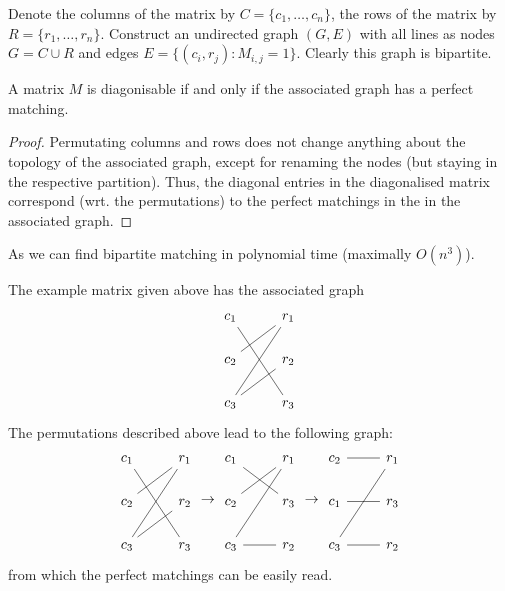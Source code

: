 \documentclass{article}
\begin{document}
\begin{solving}
    Denote the columns of the matrix by $C = \{c_1,\dots, c_n\}$, the rows of the matrix by $R = \{r_1,\dots ,r_n\}$. Construct an undirected graph $(G, E)$ with all lines as nodes $G = C\cup R$ and edges $E = \{ (c_i, r_j) : M_{i,j} = 1\}$. Clearly this graph is bipartite. 
    \begin{proposition}
        A matrix $M$ is diagonisable if and only if the associated graph has a perfect matching.
    \end{proposition}
    \begin{proof}
        Permutating columns and rows does not change anything about the topology of the associated graph, except for renaming the nodes (but staying in the respective partition). Thus, the diagonal entries in the diagonalised matrix correspond (wrt. the permutations) to the perfect matchings in the in the associated graph.
    \end{proof}
    As we can find bipartite matching in polynomial time (maximally $O(n^3)$). 


    \begin{example}
        The example matrix given above has the associated graph
        \begin{equation*}
            \begin{tikzcd}
            c_1\arrow[rdd, no head]&r_1\\
            c_2\arrow[ru, no head]&r_2\\
            c_3\arrow[ruu,  no head]\arrow[ru, no head]&r_3
            \end{tikzcd}
        \end{equation*}
        The permutations described above lead to the following graph: 
        \begin{equation*}
            \begin{tikzcd}
            c_1\arrow[rdd, no head]&r_1\\
            c_2\arrow[ru, no head]&r_2\\
            c_3\arrow[ruu,  no head]\arrow[ru, no head]&r_3
            \end{tikzcd} 
            \to 
            \begin{tikzcd}
            c_1\arrow[rd, no head]&r_1\\
            c_2\arrow[ru, no head]&r_3\\
            c_3\arrow[ruu,  no head]\arrow[r, no head]&r_2
            \end{tikzcd}
            \to 
            \begin{tikzcd}
            c_2\arrow[r, no head]&r_1\\
            c_1\arrow[r, no head]&r_3\\
            c_3\arrow[ruu,  no head]\arrow[r, no head]&r_2
            \end{tikzcd}
        \end{equation*}
        from which the perfect matchings can be easily read.
    \end{example}
\end{solving}
\newpage
\end{document}
